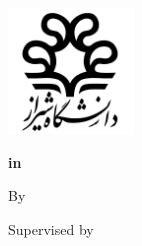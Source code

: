 \thispagestyle{empty}
\begin{titlepage}
    \begin{latin}
        \begin{center}
            \includegraphics[width=0.25\textwidth]{images/shiraz_university_logo.pdf} 
            
            \textbf{\large \universityEN}
            
            \textbf{\departmentEN}
            \vspace{8mm}
            
            \textbf{{\levelEN} {\typeEN} in \\ {\fieldEN}}
            \vspace{12mm}

            \textbf{\large \titleEN}
            \vspace{12mm}
            
            By \\
            \textbf{\authorEN}
            \vspace{8mm}
            
            Supervised by \\
            \textbf{\supervisorEN}
            \vspace{8mm}
            
            \dateEN
        \end{center}
    \end{latin}
\end{titlepage}